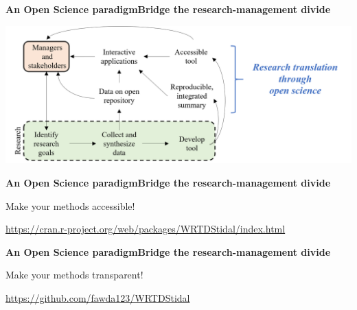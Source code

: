 \documentclass[serif]{beamer}\usepackage[]{graphicx}\usepackage[]{color}
\begin{document}
\begin{frame}{\textbf{An Open Science paradigm}}{\textbf{Bridge the research-management divide}}
\begin{center}
\includegraphics[width = \textwidth]{fig/opensci.png}
\end{center}
\end{frame}

\begin{frame}{\textbf{An Open Science paradigm}}{\textbf{Bridge the research-management divide}}
\centerline{Make your methods accessible!}
\centerline{{\small \url{https://cran.r-project.org/web/packages/WRTDStidal/index.html}}}
\begin{center}
\end{center}
\end{frame}

\begin{frame}{\textbf{An Open Science paradigm}}{\textbf{Bridge the research-management divide}}
\centerline{Make your methods transparent!}
\centerline{{\small \url{https://github.com/fawda123/WRTDStidal}}}
\begin{center}
\end{center}
\end{frame}
\end{document}
